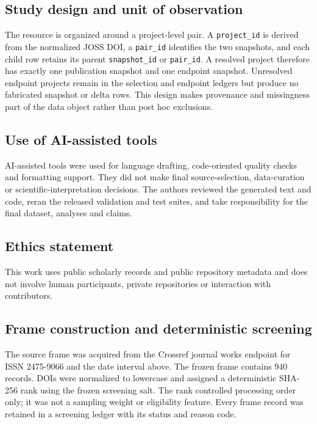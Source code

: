 \documentclass[10pt,a4paper]{article}
\newcommand{\code}[1]{\texttt{#1}}
\begin{document}
\subsection{Study design and unit of observation}

The resource is organized around a project-level pair. A \code{project\_id} is derived from the normalized JOSS DOI, a \code{pair\_id} identifies the two snapshots, and each child row retains its parent \code{snapshot\_id} or \code{pair\_id}. A resolved project therefore has exactly one publication snapshot and one endpoint snapshot. Unresolved endpoint projects remain in the selection and endpoint ledgers but produce no fabricated snapshot or delta rows. This design makes provenance and missingness part of the data object rather than post hoc exclusions.

\subsection{Use of AI-assisted tools}

AI-assisted tools were used for language drafting, code-oriented quality checks and formatting support. They did not make final source-selection, data-curation or scientific-interpretation decisions. The authors reviewed the generated text and code, reran the released validation and test suites, and take responsibility for the final dataset, analyses and claims.

\subsection{Ethics statement}

This work uses public scholarly records and public repository metadata and does not involve human participants, private repositories or interaction with contributors.

\subsection{Frame construction and deterministic screening}

The source frame was acquired from the Crossref journal works endpoint for ISSN 2475-9066 and the date interval above. The frozen frame contains 940 records. DOIs were normalized to lowercase and assigned a deterministic SHA-256 rank using the frozen screening salt. The rank controlled processing order only; it was not a sampling weight or eligibility feature. Every frame record was retained in a screening ledger with its status and reason code.
\end{document}
